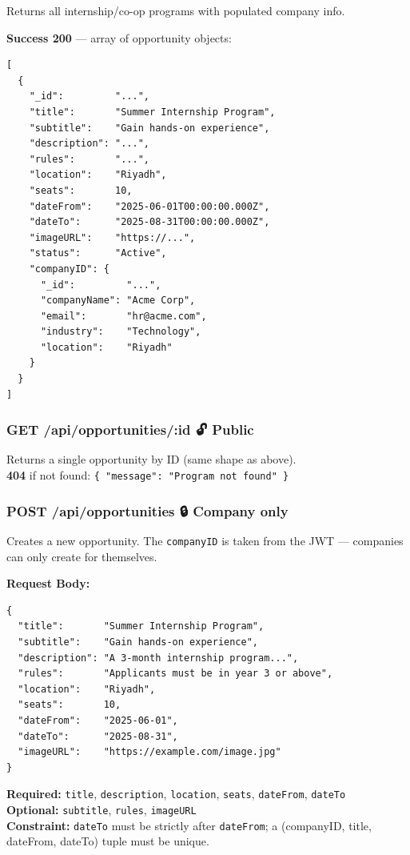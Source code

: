 \documentclass[12pt,a4paper]{article}
\begin{document}
Returns all internship/co-op programs with populated company info.

\textbf{Success 200} — array of opportunity objects:
\begin{lstlisting}[language={}]
[
  {
    "_id":         "...",
    "title":       "Summer Internship Program",
    "subtitle":    "Gain hands-on experience",
    "description": "...",
    "rules":       "...",
    "location":    "Riyadh",
    "seats":       10,
    "dateFrom":    "2025-06-01T00:00:00.000Z",
    "dateTo":      "2025-08-31T00:00:00.000Z",
    "imageURL":    "https://...",
    "status":      "Active",
    "companyID": {
      "_id":         "...",
      "companyName": "Acme Corp",
      "email":       "hr@acme.com",
      "industry":    "Technology",
      "location":    "Riyadh"
    }
  }
]
\end{lstlisting}

\vspace{0.5cm}

\subsubsection*{GET /api/opportunities/:id \quad 🔓 Public}

Returns a single opportunity by ID (same shape as above).\\
\textbf{404} if not found: \texttt{\{ "message": "Program not found" \}}

\vspace{0.5cm}

\subsubsection*{POST /api/opportunities \quad 🔒 Company only}

Creates a new opportunity. The \texttt{companyID} is taken from the JWT — companies can only create for themselves.

\textbf{Request Body:}
\begin{lstlisting}[language={}]
{
  "title":       "Summer Internship Program",
  "subtitle":    "Gain hands-on experience",
  "description": "A 3-month internship program...",
  "rules":       "Applicants must be in year 3 or above",
  "location":    "Riyadh",
  "seats":       10,
  "dateFrom":    "2025-06-01",
  "dateTo":      "2025-08-31",
  "imageURL":    "https://example.com/image.jpg"
}
\end{lstlisting}

\textbf{Required:} \texttt{title}, \texttt{description}, \texttt{location}, \texttt{seats}, \texttt{dateFrom}, \texttt{dateTo}\\
\textbf{Optional:} \texttt{subtitle}, \texttt{rules}, \texttt{imageURL}\\
\textbf{Constraint:} \texttt{dateTo} must be strictly after \texttt{dateFrom}; a (companyID, title, dateFrom, dateTo) tuple must be unique.
\end{document}
